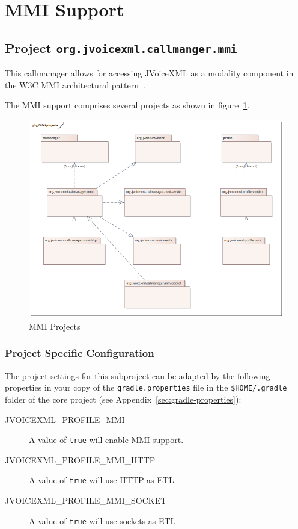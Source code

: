\documentclass[11pt,a4paper]{article}
\begin{document}
\section {MMI Support}

\subsection{Project \texttt{org.jvoicexml.callmanger.mmi}}

This callmanager allows for accessing JVoiceXML as a modality component in
the W3C MMI architectural pattern~\cite{w3c:2012:mmi_arch}.

The MMI support comprises several projects as shown in figure~\ref{fig:MMI-projects}.
\begin{figure}
\includegraphics[width=\linewidth]{MMI-projects.png}
\caption{MMI Projects}
\label{fig:MMI-projects}
\end{figure}

\subsubsection{Project Specific Configuration}

The project settings for this subproject can be adapted by the following 
properties in your copy of the \texttt{gradle.properties} file in the
\texttt{\${HOME}/.gradle} folder of the core project (see 
Appendix~\ref{sec:gradle-properties}):

\begin{description}
\item[JVOICEXML\_PROFILE\_MMI] A value of \texttt{true} will enable MMI support.
\item[JVOICEXML\_PROFILE\_MMI\_HTTP] A value of \texttt{true} will use HTTP as ETL
\item[JVOICEXML\_PROFILE\_MMI\_SOCKET] A value of \texttt{true} will use sockets as ETL
\end{description}
\end{document}
